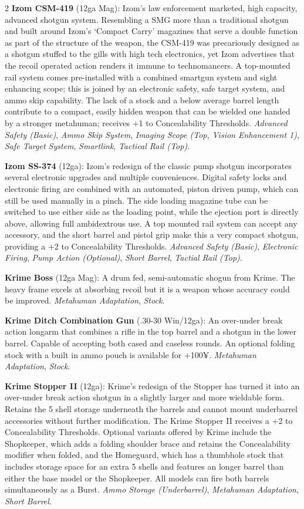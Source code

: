 \documentclass[
  oneside]{article}
\begin{document}
\begin{multicols}{2}
\textbf{Izom CSM-419} (12ga Mag): Izom's law
enforcement marketed, high capacity, advanced
shotgun system. Resembling a SMG more than a
traditional shotgun and built around Izom's
`Compact Carry' magazines that serve a double
function as part of the structure of the weapon,
the CSM-419 was precariously designed as a shotgun
stuffed to the gills with high tech electronics,
yet Izom advertises that the recoil operated
action renders it immune to technomancers. A
top-mounted rail system comes pre-installed with a
combined smartgun system and sight enhancing
scope; this is joined by an electronic safety,
safe target system, and ammo skip capability. The
lack of a stock and a below average barrel length
contribute to a compact, easily hidden weapon that
can be wielded one handed by a stronger metahuman;
receives +1 to Concealability Thresholds.
\emph{Advanced Safety (Basic)}, \emph{Ammo Skip
System}, \emph{Imaging Scope (Top, Vision
Enhancement 1)}, \emph{Safe Target System},
\emph{Smartlink}, \emph{Tactical Rail (Top)}.

\textbf{Izom SS-374} (12ga): Izom's redesign of
the classic pump shotgun incorporates several
electronic upgrades and multiple conveniences.
Digital safety locks and electronic firing are
combined with an automated, piston driven pump,
which can still be used manually in a pinch. The
side loading magazine tube can be switched to use
either side as the loading point, while the
ejection port is directly above, allowing full
ambidextrous use. A top mounted rail system can
accept any accessory, and the short barrel and
pistol grip make this a very compact shotgun,
providing a +2 to Concealability Thresholds.
\emph{Advanced Safety (Basic)}, \emph{Electronic
Firing}, \emph{Pump Action (Optional)},
\emph{Short Barrel}, \emph{Tactial Rail (Top)}.

\textbf{Krime Boss} (12ga Mag): A drum fed,
semi-automatic shogun from Krime. The heavy frame
excels at absorbing recoil but it is a weapon
whose accuracy could be improved. \emph{Metahuman
Adaptation}, \emph{Stock}.

\textbf{Krime Ditch Combination Gun} (.30-30
Win/12ga): An over-under break action longarm that
combines a rifle in the top barrel and a shotgun
in the lower barrel. Capable of accepting both
cased and caseless rounds. An optional folding
stock with a built in ammo pouch is available for
+100¥. \emph{Metahuman Adaptation}, \emph{Stock}.

\textbf{Krime Stopper II} (12ga): Krime's redesign
of the Stopper has turned it into an over-under
break action shotgun in a slightly larger and more
wieldable form. Retains the 5 shell storage
underneath the barrels and cannot mount
underbarrel accessories without further
modification. The Krime Stopper II receives a +2
to Concealability Thresholds. Optional variants
offered by Krime include the Shopkeeper, which
adds a folding shoulder brace and retains the
Concealability modifier when folded, and the
Homeguard, which has a thumbhole stock that
includes storage space for an extra 5 shells and
features an longer barrel than either the base
model or the Shopkeeper. All models can fire both
barrels simultaneously as a Burst. \emph{Ammo
Storage (Underbarrel)}, \emph{Metahuman
Adaptation}, \emph{Short Barrel}.


\end{multicols}
\end{document}
